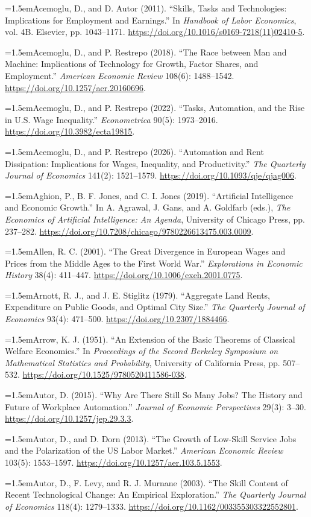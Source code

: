 \documentclass[12pt]{article}
\theoremstyle{plain}
\newcommand{\refentry}[1]{\par\hangindent=1.5em\hangafter=1\noindent #1}
\begin{document}
{\small\singlespacing
\refentry{Acemoglu, D., and D. Autor (2011). ``Skills, Tasks and Technologies: Implications for Employment and Earnings.'' In \emph{Handbook of Labor Economics}, vol. 4B. Elsevier, pp. 1043--1171. \url{https://doi.org/10.1016/s0169-7218(11)02410-5}.}
\refentry{Acemoglu, D., and P. Restrepo (2018). ``The Race between Man and Machine: Implications of Technology for Growth, Factor Shares, and Employment.'' \emph{American Economic Review} 108(6): 1488--1542. \url{https://doi.org/10.1257/aer.20160696}.}
\refentry{Acemoglu, D., and P. Restrepo (2022). ``Tasks, Automation, and the Rise in U.S. Wage Inequality.'' \emph{Econometrica} 90(5): 1973--2016. \url{https://doi.org/10.3982/ecta19815}.}
\refentry{Acemoglu, D., and P. Restrepo (2026). ``Automation and Rent Dissipation: Implications for Wages, Inequality, and Productivity.'' \emph{The Quarterly Journal of Economics} 141(2): 1521--1579. \url{https://doi.org/10.1093/qje/qjag006}.}
\refentry{Aghion, P., B. F. Jones, and C. I. Jones (2019). ``Artificial Intelligence and Economic Growth.'' In A. Agrawal, J. Gans, and A. Goldfarb (eds.), \emph{The Economics of Artificial Intelligence: An Agenda}, University of Chicago Press, pp. 237--282. \url{https://doi.org/10.7208/chicago/9780226613475.003.0009}.}
\refentry{Allen, R. C. (2001). ``The Great Divergence in European Wages and Prices from the Middle Ages to the First World War.'' \emph{Explorations in Economic History} 38(4): 411--447. \url{https://doi.org/10.1006/exeh.2001.0775}.}
\refentry{Arnott, R. J., and J. E. Stiglitz (1979). ``Aggregate Land Rents, Expenditure on Public Goods, and Optimal City Size.'' \emph{The Quarterly Journal of Economics} 93(4): 471--500. \url{https://doi.org/10.2307/1884466}.}
\refentry{Arrow, K. J. (1951). ``An Extension of the Basic Theorems of Classical Welfare Economics.'' In \emph{Proceedings of the Second Berkeley Symposium on Mathematical Statistics and Probability}, University of California Press, pp. 507--532. \url{https://doi.org/10.1525/9780520411586-038}.}
\refentry{Autor, D. (2015). ``Why Are There Still So Many Jobs? The History and Future of Workplace Automation.'' \emph{Journal of Economic Perspectives} 29(3): 3--30. \url{https://doi.org/10.1257/jep.29.3.3}.}
\refentry{Autor, D., and D. Dorn (2013). ``The Growth of Low-Skill Service Jobs and the Polarization of the US Labor Market.'' \emph{American Economic Review} 103(5): 1553--1597. \url{https://doi.org/10.1257/aer.103.5.1553}.}
\refentry{Autor, D., F. Levy, and R. J. Murnane (2003). ``The Skill Content of Recent Technological Change: An Empirical Exploration.'' \emph{The Quarterly Journal of Economics} 118(4): 1279--1333. \url{https://doi.org/10.1162/003355303322552801}.}
}
\end{document}
